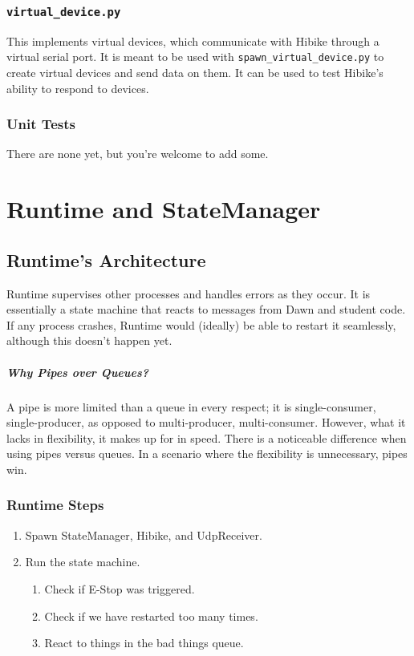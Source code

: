 \documentclass[12pt]{book}
\begin{document}
\subsection{\texttt{virtual\_device.py}}
This implements virtual devices, which communicate with Hibike
through a virtual serial port. It is meant to be used with
\texttt{spawn\_virtual\_device.py} to create virtual devices
and send data on them. It can be used to test Hibike's ability to
respond to devices.
\subsection{Unit Tests}
There are none yet, but you're welcome to add some.


\chapter{Runtime and StateManager}
\section{Runtime's Architecture}
Runtime supervises other processes and handles errors as they occur. It is
essentially a state machine that reacts to messages from Dawn and student
code. If any process crashes, Runtime would (ideally) be able to restart
it seamlessly, although this doesn't happen yet.

\paragraph{Why Pipes over Queues?}

A pipe is more limited than a queue in every respect; it is single-consumer,
single-producer, as opposed to multi-producer, multi-consumer.
However, what it lacks in flexibility, it makes up for in speed.
There is a noticeable difference when using pipes versus queues.
In a scenario where the flexibility is unnecessary, pipes win.

\subsection{Runtime Steps}
\begin{enumerate}
    \item Spawn StateManager, Hibike, and UdpReceiver.
    \item Run the state machine.
        \begin{enumerate}
            \item Check if E-Stop was triggered.
            \item Check if we have restarted too many times.
            \item React to things in the bad things queue.
        \end{enumerate}
\end{enumerate}
\end{document}
